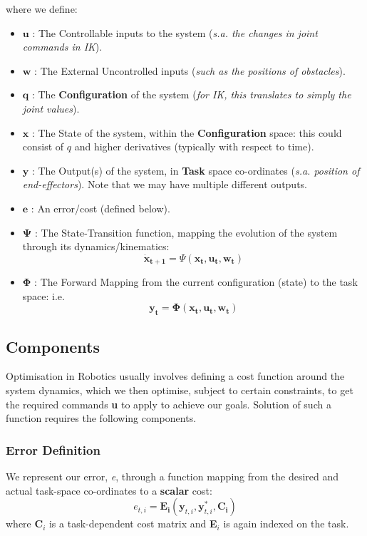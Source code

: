 \documentclass[12pt,a4paper,onecolumn]{article}
\begin{document}
\noindent where we define:
\begin{itemize}
\item $\mathbf{u}$ : The Controllable inputs to the system (\textit{s.a. the changes in joint commands in IK}).
\item $\mathbf{w}$ : The External Uncontrolled inputs (\textit{such as the positions of obstacles}).
\item $\mathbf{q}$ : The \textbf{Configuration} of the system (\textit{for IK, this translates to simply the joint values}).
\item $\mathbf{x}$ : The State of the system, within the \textbf{Configuration} space: this could consist of $q$ and higher derivatives (typically with respect to time).
\item $\mathbf{y}$ : The Output(s) of the system, in \textbf{Task} space co-ordinates (\textit{s.a. position of end-effectors}). Note that we may have multiple different outputs.
\item $\mathbf{e}$ : An error/cost (defined below).
\item $\mathbf{\Psi}$ : The State-Transition function, mapping the evolution of the system through its dynamics/kinematics:
\begin{equation}
\mathbf{\dot x_{t+1}} = \Psi\left(\mathbf{x_t}, \mathbf{u_t}, \mathbf{w_t} \right) \label{EQ_STATE_TRANSITION_DEFINITION}
\end{equation}
\item $\mathbf{\Phi}$ : The Forward Mapping from the current configuration (state) to the task space: i.e.
\begin{equation}
\mathbf{y_t} = \mathbf{\Phi(x_{t}, u_t, w_t)} \label{EQ_PHI_DEFINITION}
\end{equation}
\end{itemize}

\subsection{Components}
Optimisation in Robotics usually involves defining a cost function around the system dynamics, which we then optimise, subject to certain constraints, to get the required commands \textbf{u} to apply to achieve our goals. Solution of such a function requires the following components.

\subsubsection*{Error Definition}
We represent our error, \textit{e}, through a function mapping from the desired and actual task-space co-ordinates to a \textbf{scalar} cost:
\begin{equation}
e_{t,i} = \mathbf{E_i}\left(\mathbf{y}_{t,i}, \mathbf{y}_{t,i}^*, \mathbf{C_i}\right) \label{EQ_ERROR_FUNCTION}
\end{equation}
where \textbf{C}$_i$ is a task-dependent cost matrix and \textbf{E}$_i$ is again indexed on the task.
\end{document}
